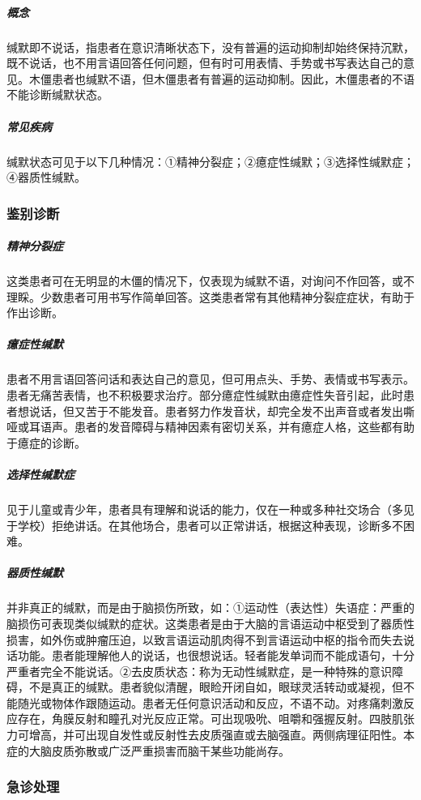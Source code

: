 \subparagraph{概念}

缄默即不说话，指患者在意识清晰状态下，没有普遍的运动抑制却始终保持沉默，既不说话，也不用言语回答任何问题，但有时可用表情、手势或书写表达自己的意见。木僵患者也缄默不语，但木僵患者有普遍的运动抑制。因此，木僵患者的不语不能诊断缄默状态。

\subparagraph{常见疾病}

缄默状态可见于以下几种情况：①精神分裂症；②癔症性缄默；③选择性缄默症；④器质性缄默。

\subsubsection{鉴别诊断}

\subparagraph{精神分裂症}

这类患者可在无明显的木僵的情况下，仅表现为缄默不语，对询问不作回答，或不理睬。少数患者可用书写作简单回答。这类患者常有其他精神分裂症症状，有助于作出诊断。

\subparagraph{癔症性缄默}

患者不用言语回答问话和表达自己的意见，但可用点头、手势、表情或书写表示。患者无痛苦表情，也不积极要求治疗。部分癔症性缄默由癔症性失音引起，此时患者想说话，但又苦于不能发音。患者努力作发音状，却完全发不出声音或者发出嘶哑或耳语声。患者的发音障碍与精神因素有密切关系，并有癔症人格，这些都有助于癔症的诊断。

\subparagraph{选择性缄默症}

见于儿童或青少年，患者具有理解和说话的能力，仅在一种或多种社交场合（多见于学校）拒绝讲话。在其他场合，患者可以正常讲话，根据这种表现，诊断多不困难。

\subparagraph{器质性缄默}

并非真正的缄默，而是由于脑损伤所致，如：①运动性（表达性）失语症：严重的脑损伤可表现类似缄默的症状。这类患者是由于大脑的言语运动中枢受到了器质性损害，如外伤或肿瘤压迫，以致言语运动肌肉得不到言语运动中枢的指令而失去说话功能。患者能理解他人的说话，也很想说话。轻者能发单词而不能成语句，十分严重者完全不能说话。②去皮质状态：称为无动性缄默症，是一种特殊的意识障碍，不是真正的缄默。患者貌似清醒，眼睑开闭自如，眼球灵活转动或凝视，但不能随光或物体作跟随运动。患者无任何意识活动和反应，不语不动。对疼痛刺激反应存在，角膜反射和瞳孔对光反应正常。可出现吸吮、咀嚼和强握反射。四肢肌张力可增高，并可出现自发性或反射性去皮质强直或去脑强直。两侧病理征阳性。本症的大脑皮质弥散或广泛严重损害而脑干某些功能尚存。

\subsubsection{急诊处理}

